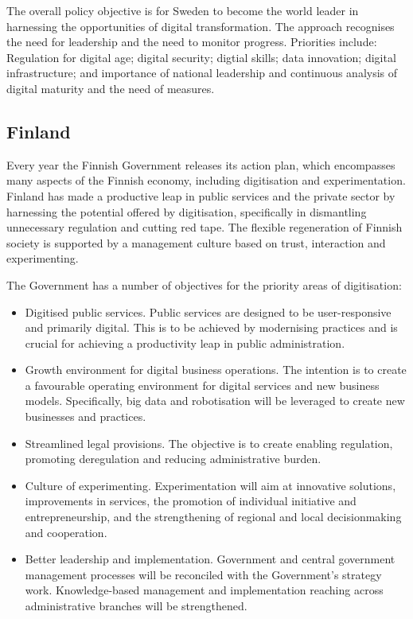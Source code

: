 The overall policy objective is for Sweden to become the world leader in harnessing the opportunities of digital transformation. The approach recognises the need for leadership and the need to monitor progress. Priorities include: Regulation for digital age; digital security; digtial skills; data innovation; digital infrastructure; and importance of national leadership and continuous analysis of digital maturity and the need of measures.

\subsection{Finland}

Every year the Finnish Government releases its action plan, which encompasses many aspects of the Finnish economy, including digitisation and experimentation. Finland has made a productive leap in public services and the private sector by harnessing the potential offered by digitisation, specifically in dismantling unnecessary regulation and cutting red tape. The flexible regeneration of Finnish society is supported by a management culture based on trust, interaction and experimenting.

The Government has a number of objectives for the priority areas of digitisation:
\begin{itemize}
    \item Digitised public services. Public services are designed to be user-responsive and primarily digital. This is to be achieved by modernising practices and is crucial for achieving a productivity leap in public administration.
    \item Growth environment for digital business operations. The intention is to create a favourable operating environment for digital services and new business models. Specifically, big data and robotisation will be leveraged to create new businesses and practices.
    \item Streamlined legal provisions. The objective is to create enabling regulation, promoting deregulation and reducing administrative burden.
    \item Culture of experimenting. Experimentation will aim at innovative solutions, improvements in services, the promotion of individual initiative and entrepreneurship, and the strengthening of regional and local decisionmaking and cooperation.
    \item Better leadership and implementation. Government and central government management processes will be reconciled with the Government's strategy work. Knowledge-based management and implementation reaching across administrative branches will be strengthened.
\end{itemize}

